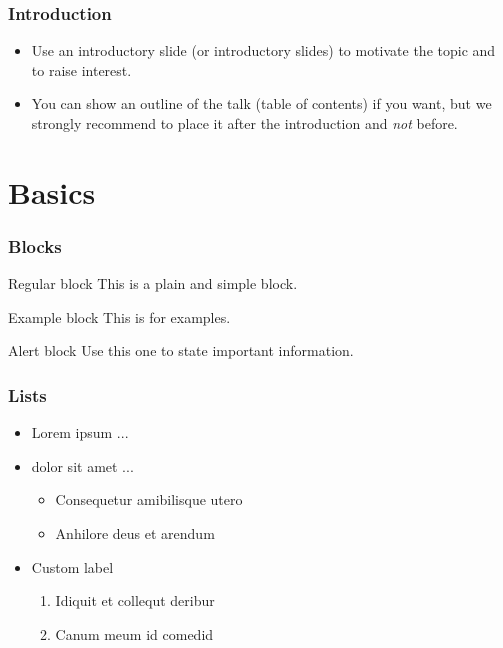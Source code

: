 \documentclass[t,english]{beamer}
\begin{document}


\begin{frame}
  \frametitle{Introduction}
  
  \begin{itemize}
      \item Use an introductory slide (or introductory slides) to motivate the topic and to raise interest.
      \item You can show an outline of the talk (table of contents) if you want, but we strongly recommend to place it after the introduction and \emph{not} before.
  \end{itemize}
    
\end{frame}


\section{Basics}

\begin{frame}
  \frametitle{Blocks}

  \begin{block}{Regular block}
    This is a plain and simple block.
  \end{block}

  \begin{exampleblock}{Example block}
    This is for examples.
  \end{exampleblock}

  \begin{alertblock}{Alert block}
    Use this one to state important information.
  \end{alertblock}

\end{frame}

\begin{frame}
  \frametitle{Lists}

  \begin{itemize}[<+->]
    \item Lorem ipsum ...
    \item dolor sit amet ...
    \begin{itemize}
      \item Consequetur amibilisque utero
      \item Anhilore deus et arendum
    \end{itemize}
    \item[$\leadsto$] Custom label
    \begin{enumerate}
      \item Idiquit et collequt deribur
      \item Canum meum id comedid
    \end{enumerate}
  \end{itemize}

\end{frame}
\end{document}
